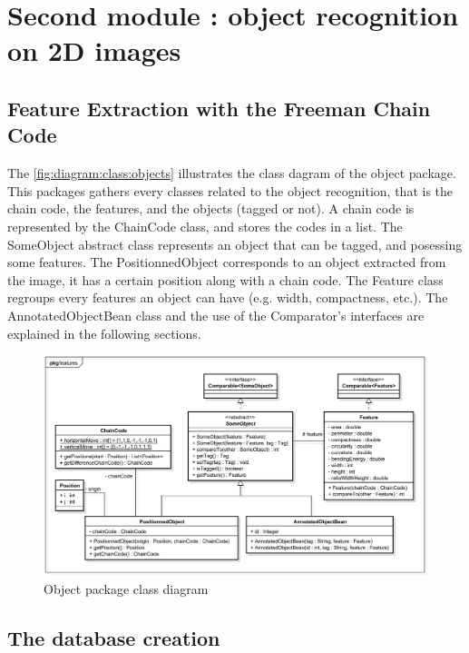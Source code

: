 \section{Second module : object recognition on 2D images}



\subsection{Feature Extraction with the Freeman Chain Code}

The \vref{fig:diagram:class:objects} illustrates the class dagram of the object package. This packages gathers every classes related to the object recognition, that is the chain code, the features, and the objects (tagged or not). A chain code is represented by the ChainCode class, and stores the codes in a list. The SomeObject abstract class represents an object that can be tagged, and posessing some features. The PositionnedObject corresponds to an object extracted from the image, it has a certain position along with a chain code. The Feature class regroups every features an object can have (e.g. width, compactness, etc.). The AnnotatedObjectBean class and the use of the Comparator's interfaces are explained in the following sections. 


\begin{figure}[H]
	\centering 
	\includegraphics[width=1\textwidth]{images/diagrams/class_diagram_objects}
	\caption{Object package class diagram}
	\label{fig:diagram:class:objects}
\end{figure}








\subsection{The database creation}

